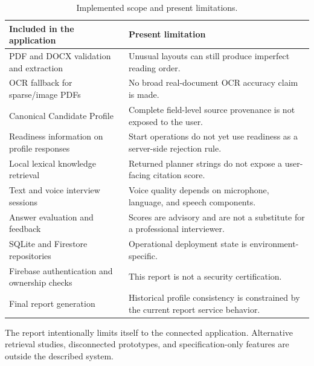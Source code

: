 \begin{table}[htbp]\centering
\caption{Implemented scope and present limitations.}\label{tab:scope}
\begin{tabularx}{\textwidth}{YY}\toprule
Included in the application & Present limitation\\ \midrule
PDF and DOCX validation and extraction & Unusual layouts can still produce imperfect reading order.\\
OCR fallback for sparse/image PDFs & No broad real-document OCR accuracy claim is made.\\
Canonical Candidate Profile & Complete field-level source provenance is not exposed to the user.\\
Readiness information on profile responses & Start operations do not yet use readiness as a server-side rejection rule.\\
Local lexical knowledge retrieval & Returned planner strings do not expose a user-facing citation score.\\
Text and voice interview sessions & Voice quality depends on microphone, language, and speech components.\\
Answer evaluation and feedback & Scores are advisory and are not a substitute for a professional interviewer.\\
SQLite and Firestore repositories & Operational deployment state is environment-specific.\\
Firebase authentication and ownership checks & This report is not a security certification.\\
Final report generation & Historical profile consistency is constrained by the current report service behavior.\\
\bottomrule\end{tabularx}
\end{table}

The report intentionally limits itself to the connected application. Alternative retrieval studies, disconnected prototypes, and specification-only features are outside the described system.
